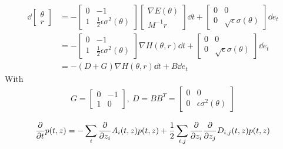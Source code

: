 \begin{align*}
    \dd{\begin{bmatrix}\theta \\ r \end{bmatrix}} &= 
    -\begin{bmatrix}
        0 & -1 \\ 
        1 & \frac{1}{2}\epsilon\sigma^2(\theta)
    \end{bmatrix} \begin{bmatrix}
        \nabla{E}(\theta)  \\ M^{-1}r
    \end{bmatrix}\dd{t} + \begin{bmatrix}
        0 & 0 \\ 
        0 & \sqrt{\epsilon}\sigma(\theta)
    \end{bmatrix} \dd{e_t} \\
    &= 
    -\begin{bmatrix}
        0 & -1 \\ 
        1 & \frac{1}{2}\epsilon\sigma^2(\theta)
    \end{bmatrix} \nabla H(\theta, r)\dd{t} + \begin{bmatrix}
        0 & 0 \\ 
        0 & \sqrt{\epsilon}\sigma(\theta)
    \end{bmatrix} \dd{e_t} \\
    &=  - (D + G) \nabla H(\theta, r)\dd{t} + B \dd{e_t} 
\end{align*}
With
\begin{align*}
    G=\begin{bmatrix}0 & -1 \\ 1 & 0 \end{bmatrix}, ~D = BB^T= \begin{bmatrix}
        0 & 0 \\ 
        0 & \epsilon\sigma^2(\theta)
    \end{bmatrix}
\end{align*}

\begin{align*}
    \pdv{t} p(t, z) &= - \sum_{i} \pdv{z_i} A_i(t, z) p(t, z) 
        + \frac{1}{2}\sum_{i,j}\pdv{z_i}\pdv{z_j}D_{i,j}(t, z)p(t, z) \\
\end{align*}





